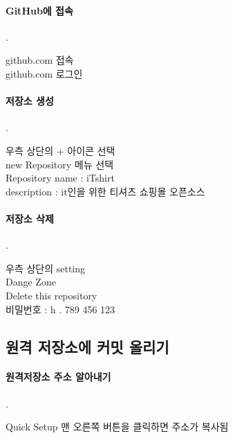 \documentclass[12pt, a4paper, oneside]{book}
\begin{document}
			\paragraph{GitHub에 접속} 
			.\\

			\begin{tcolorbox}
				github.com 접속 \\
				github.com 로그인 
			\end{tcolorbox}

			\paragraph{저장소 생성}
			.\\

			\begin{tcolorbox}
				우측 상단의 + 아이콘 선택 \\
				new Repository 메뉴 선택 \\
				Repository name : iTshirt \\
				description : it인을 위한 티셔츠 쇼핑몰 오픈소스
			\end{tcolorbox}


			\paragraph{저장소 삭제}
			.\\

			\begin{tcolorbox}
				우측 상단의 setting \\
				Dange Zone \\
				Delete this repository  \\
				비밀번호 : h . 789 456 123  \\
			\end{tcolorbox}


		\subsection 	{원격 저장소에 커밋 올리기}

			\paragraph{원격저장소 주소 알아내기}
			.\\

			\begin{tcolorbox}
				Quick Setup  맨 오른쪽 버튼을 클릭하면 주소가 복사됨 
			\end{tcolorbox}
\end{document}
